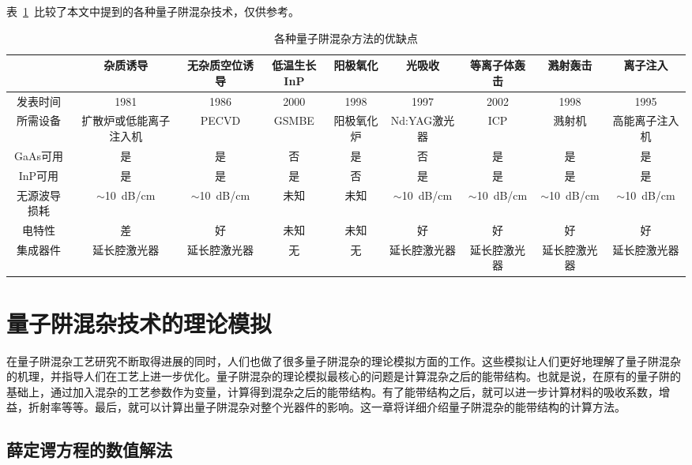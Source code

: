 \documentclass{ZJUthesis}
\begin{document}
表~\ref{qwi_compare}~比较了本文中提到的各种量子阱混杂技术，仅供参考。
\begin{table}[htbp]
    \caption{各种量子阱混杂方法的优缺点}
    \centering
    \label{qwi_compare}
    \begin{tabular}{ccccccccc}
        \hline
        \hline
                   &杂质诱导 &无杂质空位诱导 &低温生长InP &阳极氧化 &光吸收 &等离子体轰击 &溅射轰击 &离子注入\\
        \hline
        发表时间    &1981    &1986         &2000      &1998    &1997  &2002       &1998    &1995\\
        所需设备    &扩散炉或低能离子注入机 &PECVD &GSMBE &阳极氧化炉 &Nd:YAG激光器 &ICP &溅射机  &高能离子注入机\\
        GaAs可用    &是     &是     &否     &是     &否     &是     &是     &是\\
        InP可用     &是     &是     &是     &否     &是     &是     &是     &是\\
        无源波导损耗 &$\sim$10~dB/cm &$\sim$10~dB/cm &未知 &未知 &$\sim$10~dB/cm &$\sim$10~dB/cm &$\sim$10~dB/cm &$\sim$10~dB/cm\\
        电特性      &差     &好     &未知    &未知   &好     &好     &好     &好\\
        集成器件    &延长腔激光器 &延长腔激光器 &无 &无 &延长腔激光器 &延长腔激光器 &延长腔激光器 &延长腔激光器\\
        \hline
        \hline
    \end{tabular}
\end{table}


\chapter{量子阱混杂技术的理论模拟}

在量子阱混杂工艺研究不断取得进展的同时，人们也做了很多量子阱混杂的理论模拟方面的工作。这些模拟让人们更好地理解了量子阱混杂的机理，并指导人们在工艺上进一步优化。量子阱混杂的理论模拟最核心的问题是计算混杂之后的能带结构。也就是说，在原有的量子阱的基础上，通过加入混杂的工艺参数作为变量，计算得到混杂之后的能带结构。有了能带结构之后，就可以进一步计算材料的吸收系数，增益，折射率等等。最后，就可以计算出量子阱混杂对整个光器件的影响。这一章将详细介绍量子阱混杂的能带结构的计算方法。

\section{薛定谔方程的数值解法}
\end{document}
